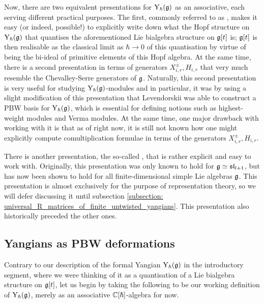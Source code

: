     Now, there are two equivalent presentations for $\mathrm{Y}_{\hbar}(\mathfrak{g})$ as an associative, each serving different practical purposes. The first, commonly referred to as , makes it easy (or indeed, possible!) to explicitly write down what the Hopf structure on $\mathrm{Y}_{\hbar}(\mathfrak{g})$ that quantises the aforementioned Lie bialgebra structure on $\mathfrak{g}[t]$ is; $\mathfrak{g}[t]$ is then realisable as the classical limit as $\hbar \to 0$ of this quantisation by virtue of being the bi-ideal of primitive elements of this Hopf algebra. At the same time, there is a second presentation in terms of generators $X_{i, r}^{\pm}, H_{i, r}$ that very much resemble the Chevalley-Serre generators of $\mathfrak{g}$. Naturally, this second presentation is very useful for studying $\mathrm{Y}_{\hbar}(\mathfrak{g})$-modules and in particular, it was by using a slight modification of this presentation that Levendorskii was able to construct a PBW basis for $\mathrm{Y}_{\hbar}(\mathfrak{g})$, which is essential for defining notions such as highest-weight modules and Verma modules. At the same time, one major drawback with working with it is that as of right now, it is still not known how one might explicitly compute comultiplication formulae in terms of the generators $X_{i, r}^{\pm}, H_{i, r}$. 

    There is another presentation, the so-called , that is rather explicit and easy to work with. Originally, this presentation was only known to hold for $\mathfrak{g} \simeq \mathfrak{sl}_{l + 1}$, but has now been shown to hold for all finite-dimensional simple Lie algebras $\mathfrak{g}$. This presentation is almost exclusively for the purpose of representation theory, so we will defer discussing it until subsection \ref{subsection: universal_R_matrices_of_finite_untwisted_yangians}. This presentation also historically preceded the other ones.

    \subsection{Yangians as PBW deformations}
        Contrary to our description of the formal Yangian $\mathrm{Y}_{\hbar}(\mathfrak{g})$ in the introductory segment, where we were thinking of it as a quantisation of a Lie bialgebra structure on $\mathfrak{g}[t]$, let us begin by taking the following to be our working definition of $\mathrm{Y}_{\hbar}(\mathfrak{g})$, merely as an associative $\mathbb{C}[\hbar]$-algebra for now.

